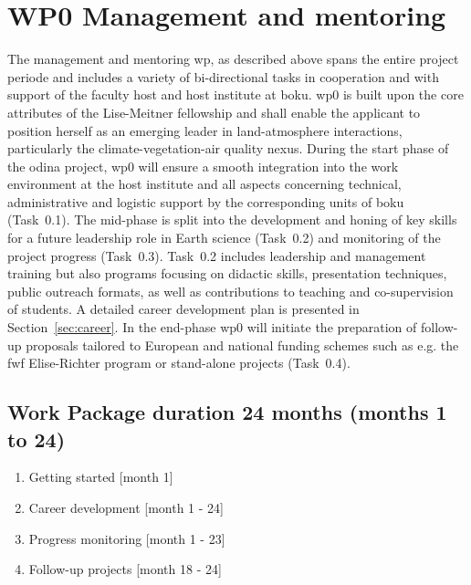 \section{WP0 Management and mentoring}
\label{sec:wp0}
The management and mentoring \gls{wp}, as described above spans the entire project periode and includes a variety of bi-directional tasks in cooperation and with support of the faculty host and host institute at \gls{boku}. \gls{wp}0 is built upon the  core attributes of the Lise-Meitner fellowship  and shall enable the applicant to position herself as an emerging leader in land-atmosphere interactions, particularly the climate-vegetation-air quality nexus. During the start phase of the \gls{odina} project, \gls{wp}0 will ensure a smooth integration into the work environment at the host institute  and all aspects concerning technical, administrative and logistic support by the corresponding units of \gls{boku} (Task~0.1). The mid-phase is split into the development and honing of key skills for a future leadership role in Earth science (Task~0.2) and monitoring of the project progress (Task~0.3). Task~0.2 includes leadership and management training but also programs focusing on didactic skills, presentation techniques, public outreach formats, as well as contributions to  teaching and co-supervision of students. A detailed career development plan is presented in Section~\ref{sec:career}. In the end-phase \gls{wp}0 will initiate the preparation of follow-up proposals tailored to European and national funding schemes such as e.g. the \gls{fwf} Elise-Richter program or stand-alone projects (Task~0.4).

\subsection*{Work Package duration 24 months (months 1 to 24)}
\begin{enumerate}[start=1,label={T0.\arabic*}]
  \itemsep0pt
\item Getting started \hfill [month 1]
\item Career development \hfill [month 1 - 24]
\item Progress monitoring \hfill [month 1 - 23]
\item Follow-up projects \hfill [month 18 - 24]
\end{enumerate}


